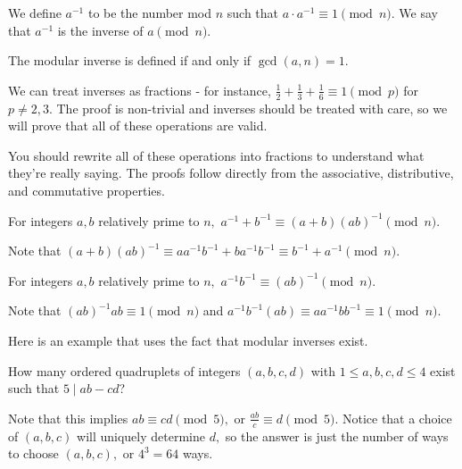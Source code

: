 \documentclass[mast]{lucky}
\begin{document}
\begin{defi}
We define $a^{-1}$ to be the number mod $n$ such that $a\cdot a^{-1}\equiv 1 \pmod{n}.$ We say that $a^{-1}$ is the inverse of $a \pmod{n}.$\end{defi}

The modular inverse is defined if and only if $\gcd(a,n)=1.$

We can treat inverses as fractions - for instance, $\frac{1}{2}+\frac{1}{3}+\frac{1}{6}\equiv 1\pmod{p}$ for $p\neq 2,3.$ The proof is non-trivial and inverses should be treated with care, so we will prove that all of these operations are valid.

You should rewrite all of these operations into fractions to understand what they're really saying. The proofs follow directly from the associative, distributive, and commutative properties.

\begin{fact}
For integers $a,b$ relatively prime to $n,$ $a^{-1}+b^{-1}\equiv (a+b)(ab)^{-1}\pmod{n}.$
\end{fact}

\begin{pro}
Note that $(a+b)(ab)^{-1}\equiv aa^{-1}b^{-1}+ba^{-1}b^{-1}\equiv b^{-1}+a^{-1}\pmod{n}.$
\end{pro}

\begin{fact}
For integers $a,b$ relatively prime to $n,$ $a^{-1}b^{-1}\equiv(ab)^{-1}\pmod{n}.$
\end{fact}

\begin{pro}
Note that $(ab)^{-1}ab\equiv 1\pmod{n}$ and $a^{-1}b^{-1}(ab)\equiv aa^{-1}bb^{-1}\equiv 1\pmod{n}.$
\end{pro}

Here is an example that uses the fact that modular inverses exist.

\begin{exam}
How many ordered quadruplets of integers $(a,b,c,d)$ with $1\leq a,b,c,d\leq 4$ exist such that $5\mid ab-cd$?
\end{exam}

\begin{sol}
Note that this implies $ab\equiv cd\pmod{5},$ or $\frac{ab}{c}\equiv d\pmod{5}.$ Notice that a choice of $(a,b,c)$ will uniquely determine $d,$ so the answer is just the number of ways to choose $(a,b,c),$ or $4^3=64$ ways.
\end{sol}
\end{document}
